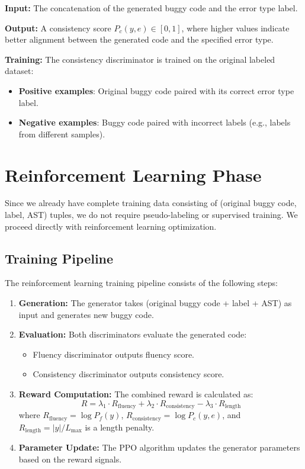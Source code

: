\textbf{Input:} The concatenation of the generated buggy code and the error type label.

\textbf{Output:} A consistency score $P_c(y, e) \in [0, 1]$, where higher values indicate better alignment between the generated code and the specified error type.

\textbf{Training:} The consistency discriminator is trained on the original labeled dataset:
\begin{itemize}
    \item \textbf{Positive examples}: Original buggy code paired with its correct error type label.
    \item \textbf{Negative examples}: Buggy code paired with incorrect labels (e.g., labels from different samples).
\end{itemize}

\section{Reinforcement Learning Phase}

Since we already have complete training data consisting of (original buggy code, label, AST) tuples, we do not require pseudo-labeling or supervised training. We proceed directly with reinforcement learning optimization.

\subsection{Training Pipeline}

The reinforcement learning training pipeline consists of the following steps:

\begin{enumerate}
    \item \textbf{Generation:} The generator takes (original buggy code + label + AST) as input and generates new buggy code.
    \item \textbf{Evaluation:} Both discriminators evaluate the generated code:
    \begin{itemize}
        \item Fluency discriminator outputs fluency score.
        \item Consistency discriminator outputs consistency score.
    \end{itemize}
    \item \textbf{Reward Computation:} The combined reward is calculated as:
    \begin{equation}
    R = \lambda_1 \cdot R_{\text{fluency}} + \lambda_2 \cdot R_{\text{consistency}} - \lambda_3 \cdot R_{\text{length}}
    \end{equation}
    where $R_{\text{fluency}} = \log P_f(y)$, $R_{\text{consistency}} = \log P_c(y, e)$, and $R_{\text{length}} = |y| / L_{\max}$ is a length penalty.
    \item \textbf{Parameter Update:} The PPO algorithm updates the generator parameters based on the reward signals.
\end{enumerate}

